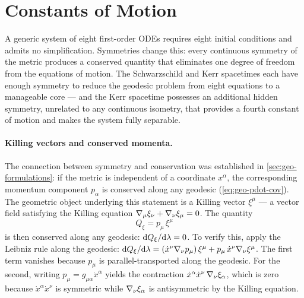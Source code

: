\section{Constants of Motion}
\label{sec:geo-constants}

A generic system of eight first-order ODEs requires eight initial conditions
and admits no simplification.  Symmetries change this: every continuous
symmetry of the metric produces a conserved quantity that eliminates one
degree of freedom from the equations of motion.  The Schwarzschild and
Kerr spacetimes each have enough symmetry to reduce the geodesic problem
from eight equations to a manageable core --- and the Kerr spacetime
possesses an additional hidden symmetry, unrelated to any continuous
isometry, that provides a fourth constant of motion and makes the system
fully separable.

\paragraph{Killing vectors and conserved momenta.}

The connection between symmetry and conservation was established in
\cref{sec:geo-formulations}: if the metric is independent of a coordinate
$x^\alpha$, the corresponding momentum component $p_\alpha$ is conserved
along any geodesic (\cref{eq:geo-pdot-cov}).  The geometric object
underlying this statement is a Killing vector $\xi^\mu$ --- a vector field
satisfying the Killing equation $\nabla_{\mu}\xi_\nu + \nabla_{\nu}\xi_\mu = 0$.
The quantity
%
\begin{equation}
  Q_\xi = p_\mu\,\xi^\mu
  \label{eq:killing-conserved}
\end{equation}
%
is then conserved along any geodesic: $\mathrm{d} Q_\xi / \mathrm{d}\lambda = 0$.  To
verify this, apply the Leibniz rule along the geodesic:
$\mathrm{d} Q_\xi/\mathrm{d}\lambda =
  (\dot{x}^\nu\nabla_{\nu}p_\mu)\,\xi^\mu
  + p_\mu\,\dot{x}^\nu\nabla_{\nu}\xi^\mu$.
The first term vanishes because $p_\mu$ is parallel-transported along the
geodesic.  For the second, writing $p_\mu = g_{\mu\alpha}\dot{x}^\alpha$
yields the contraction $\dot{x}^\alpha\dot{x}^\nu\,\nabla_{\nu}\xi_\alpha$,
which is zero because $\dot{x}^\alpha\dot{x}^\nu$ is symmetric while
$\nabla_{\nu}\xi_\alpha$ is antisymmetric by the Killing equation.


